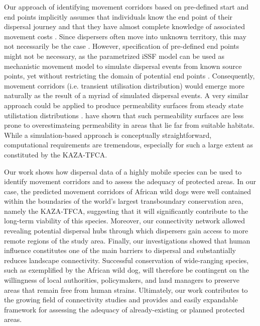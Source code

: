 \documentclass[abstract=on,10pt,a4paper,bibliography=totocnumbered]{article}
\begin{document}
Our approach of identifying movement corridors based on pre-defined start and
end points implicitly assumes that individuals know the end point of their
dispersal journey and that they have almost complete knowledge of associated
movement costs \citep{Koen.2014, Panzacchi.2016}. Since dispersers often move
into unknown territory, this may not necessarily be the case
\citep{Abrahms.2017, Cozzi.2020}. However, specification of pre-defined end
points might not be necessary, as the parametrized iSSF model can be used as
mechanistic movement model to simulate dispersal events from known source
points, yet without restricting the domain of potential end points
\citep{Signer.2017}. Consequently, movement corridors (i.e. transient
utilisation distribution) would emerge more naturally as the result of a myriad
of simulated dispersal events. A very similar approach could be applied to
produce permeability surfaces from steady state utilistation distributions
\citep{Avgar.2016, Signer.2017}. \citep{Signer.2017} have shown that such
permeability surfaces are less prone to overestimateing permeability in areas
that lie far from suitable habitats. While a simulation-based approach is
conceptually straightforward, computational requirements are tremendous,
especially for such a large extent as constituted by the KAZA-TFCA.

Our work shows how dispersal data of a highly mobile species can be used to
 identify
movement corridors and to assess the adequacy of protected areas. In our case,
the predicted movement corridors of African wild dogs were well contained within
the boundaries of the world's largest transboundary conservation area, namely
the KAZA-TFCA, suggesting that it will significantly contribute to the long-term
viability of this species. Moreover, our connectivity network allowed revealing
potential dispersal hubs through which dispersers gain access to more remote
regions of the study area. Finally, our investigations showed that human
influence constitutes one of the main barriers to dispersal and substantially
reduces landscape connectivity. Successful conservation of wide-ranging species,
such as exemplified by the African wild dog, will therefore be contingent on the
willingness of local authorities, policymakers, and land managers to preserve
areas that remain free from human strains. Ultimately, our work contributes to
the growing field of connectivity studies and provides and easily expandable
framework for assessing the adequacy of already-existing or planned protected
areas.
\end{document}
